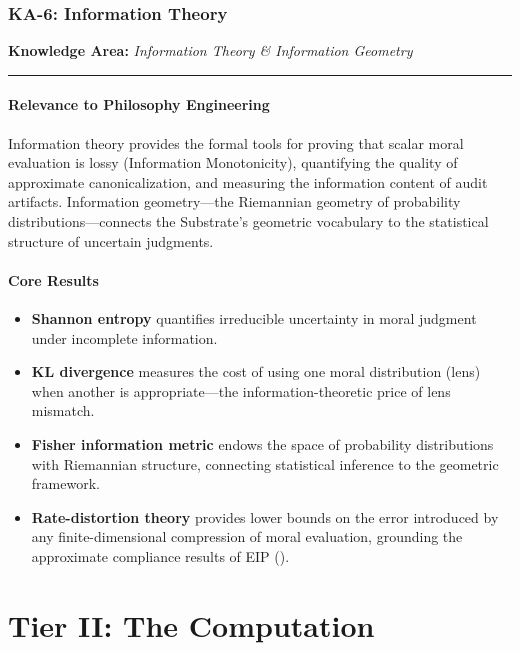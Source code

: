 \documentclass[12pt,letterpaper]{article}
\theoremstyle{definition}
\theoremstyle{plain}
\newcommand{\ka}[1]{\vspace{1em}\noindent\textbf{\large Knowledge Area:} \textit{#1}\vspace{0.5em}\hrule\vspace{0.5em}}
\begin{document}
\section{KA-6: Information Theory}
\label{sec:ka6}

\ka{Information Theory \& Information Geometry}

\subsection{Relevance to Philosophy Engineering}

Information theory provides the formal tools for proving that scalar moral evaluation is lossy (Information Monotonicity), quantifying the quality of approximate canonicalization, and measuring the information content of audit artifacts. Information geometry---the Riemannian geometry of probability distributions---connects the Substrate's geometric vocabulary to the statistical structure of uncertain judgments.

\subsection{Core Results}

\begin{itemize}
    \item \textbf{Shannon entropy} quantifies irreducible uncertainty in moral judgment under incomplete information.
    \item \textbf{KL divergence} measures the cost of using one moral distribution (lens) when another is appropriate---the information-theoretic price of lens mismatch.
    \item \textbf{Fisher information metric} endows the space of probability distributions with Riemannian structure, connecting statistical inference to the geometric framework.
    \item \textbf{Rate-distortion theory} provides lower bounds on the error introduced by any finite-dimensional compression of moral evaluation, grounding the approximate compliance results of EIP ().
\end{itemize}


\part{Tier II: The Computation}
\label{part:computation}
\end{document}
